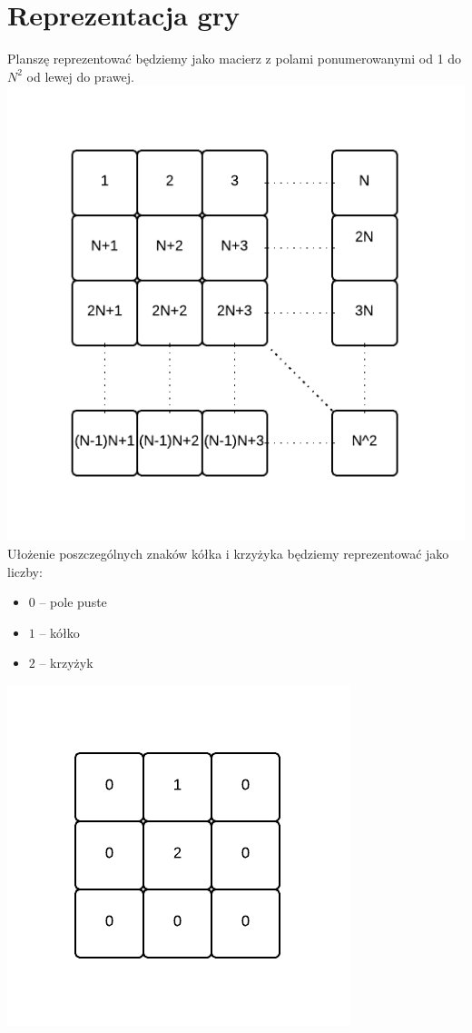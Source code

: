\documentclass[paper=a4, fontsize=11pt]{scrartcl} %
\numberwithin{equation}{section} %
\numberwithin{figure}{section} %
\numberwithin{table}{section} %
\begin{document}
\section{Reprezentacja gry}
Planszę reprezentować będziemy jako macierz z polami ponumerowanymi od 1 do $N^2$ od lewej do prawej. \\
\includegraphics[scale=0.95]{diagrams/CoevolutionaryTicTacToe2} \\
Ułożenie poszczególnych znaków kółka i krzyżyka będziemy reprezentować jako liczby: \\
\begin{itemize}
	\item $0$ -- pole puste
	\item $1$ -- kółko
	\item $2$ -- krzyżyk
\end{itemize}
\includegraphics[scale=1]{diagrams/CoevolutionaryTicTacToe3} \\
\end{document}
